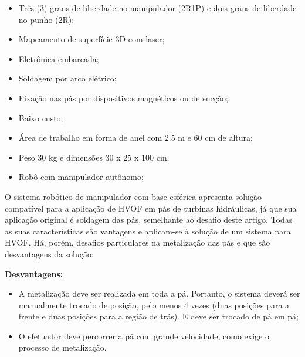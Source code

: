 \begin{itemize}
  \item Três (3) graus de liberdade no manipulador (2R1P) e dois graus de
  liberdade no punho (2R);
  \item Mapeamento de superfície 3D com laser;
  \item Eletrônica embarcada;
  \item Soldagem por arco elétrico;
  \item Fixação nas pás por dispositivos magnéticos ou de sucção;
  \item Baixo custo;
  \item Área de trabalho em forma de anel com 2.5 m e 60 cm de altura;
  \item Peso 30 kg e dimensões 30 x 25 x 100 cm;
  \item Robô com manipulador autônomo;
\end{itemize}

O sistema robótico de manipulador com base esférica apresenta solução compatível
para a aplicação de HVOF em pás de turbinas hidráulicas, já que sua aplicação
original é soldagem das pás, semelhante ao desafio deste artigo. Todas as suas
características são vantagens e aplicam-se à solução de um sistema para HVOF.
Há, porém, desafios particulares na metalização das pás e que são desvantagens
da solução:

\textbf{Desvantagens:}
\begin{itemize}
  \item A metalização deve ser realizada em toda a pá. Portanto, o sistema
  deverá ser manualmente trocado de posição, pelo menos 4 vezes (duas posições
  para a frente e duas posições para a região de trás). E deve ser trocado de pá
  em pá;
  \item O efetuador deve percorrer a pá com grande velocidade, como exige o
  processo de metalização.
\end{itemize}